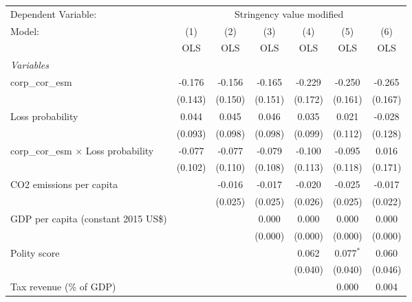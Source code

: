 
\begingroup
\centering
\begin{tabular}{lcccccc}
   \toprule
   Dependent Variable: & \multicolumn{6}{c}{Stringency value modified}\\
   Model:                                      & (1)     & (2)     & (3)     & (4)     & (5)         & (6)\\  
                                               &  OLS    & OLS     & OLS     & OLS     & OLS         & OLS\\  
   \midrule
   \emph{Variables}\\
   corp\_cor\_esm                              & -0.176  & -0.156  & -0.165  & -0.229  & -0.250      & -0.265\\   
                                               & (0.143) & (0.150) & (0.151) & (0.172) & (0.161)     & (0.167)\\   
   Loss probability                            & 0.044   & 0.045   & 0.046   & 0.035   & 0.021       & -0.028\\   
                                               & (0.093) & (0.098) & (0.098) & (0.099) & (0.112)     & (0.128)\\   
   corp\_cor\_esm $\times$ Loss probability    & -0.077  & -0.077  & -0.079  & -0.100  & -0.095      & 0.016\\   
                                               & (0.102) & (0.110) & (0.108) & (0.113) & (0.118)     & (0.171)\\   
   CO2 emissions per capita                    &         & -0.016  & -0.017  & -0.020  & -0.025      & -0.017\\   
                                               &         & (0.025) & (0.025) & (0.026) & (0.025)     & (0.022)\\   
   GDP per capita (constant 2015 US\$)         &         &         & 0.000   & 0.000   & 0.000       & 0.000\\   
                                               &         &         & (0.000) & (0.000) & (0.000)     & (0.000)\\   
   Polity score                                &         &         &         & 0.062   & 0.077$^{*}$ & 0.060\\   
                                               &         &         &         & (0.040) & (0.040)     & (0.046)\\   
   Tax revenue (\% of GDP)                     &         &         &         &         & 0.000       & 0.004\\   

\end{tabular}
